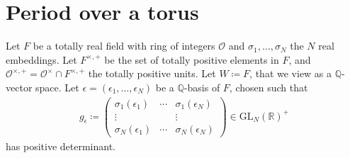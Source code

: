 \documentclass[twoside,a4paper,10pt]{article} %
\newcommand{\8}{\infty}
\newcommand{\GL}{\mathrm{GL}}
\newcommand{\R}{\mathbb{R}}
\newcommand{\Q}{\mathbb{Q}}
\newcommand{\Ocal}{\mathcal{O}}
\theoremstyle{mytheoremstyle}
\theoremstyle{remark}
\numberwithin{equation}{section}
\begin{document}
\section{Period over a torus}
 Let $F$ be a totally real field with ring of integers $\Ocal$ and $\sigma_1,\dots,\sigma_N$ the $N$ real embeddings. Let $F^{\times,+}$ be the set of totally positive elements in $F$, and $\Ocal^{\times,+} = \Ocal^{\times} \cap F^{\times,+}$ the totally positive units. Let $W \coloneqq F$, that we view as a $\Q$-vector space. Let $\epsilon=(\epsilon_1, \dots, \epsilon_N)$ be a $\Q$-basis of $F$, chosen such that
\begin{align}
g_{\epsilon} \coloneqq \begin{pmatrix}
\sigma_1(\epsilon_1) & \cdots & \sigma_1(\epsilon_N) \\[1em]
\vdots & & \vdots \\[1em]
\sigma_N(\epsilon_1) & \cdots & \sigma_N(\epsilon_N)
\end{pmatrix} \in \GL_N(\R)^+
\end{align}
has positive determinant. %
\end{document}
